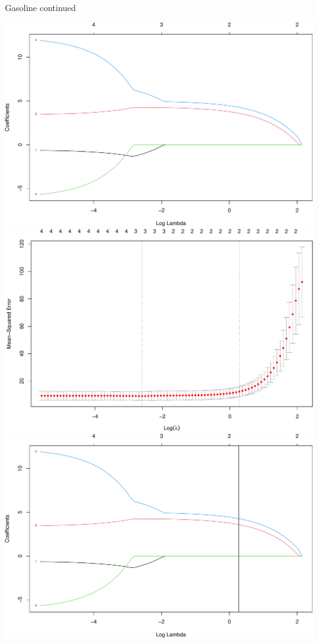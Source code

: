 \documentclass[
  ignorenonframetext,
]{beamer}
\begin{document}
\begin{frame}[fragile]

\begin{block}{Gasoline continued}

\includegraphics{L2_files/figure-beamer/unnamed-chunk-13-1.pdf}
\includegraphics{L2_files/figure-beamer/unnamed-chunk-13-2.pdf}
\includegraphics{L2_files/figure-beamer/unnamed-chunk-13-3.pdf}


\end{block}
\end{frame}
\end{document}
